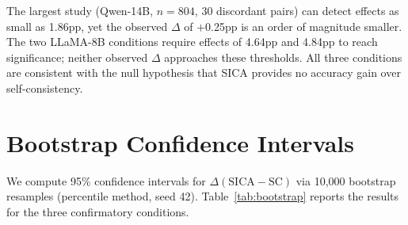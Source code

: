 \begin{table}[h]
\centering
\small
{}
\caption{Power analysis for confirmatory conditions ($n \geq 200$). MDE = minimum detectable effect at 80\% power. All observed effects fall below their respective MDEs, and observed power remains below 21\% in every case.}
\label{tab:power}
\end{table}

The largest study (Qwen-14B, $n{=}804$, 30 discordant pairs) can detect effects as small as 1.86pp, yet the observed $\Delta$ of $+$0.25pp is an order of magnitude smaller. The two LLaMA-8B conditions require effects of 4.64pp and 4.84pp to reach significance; neither observed $\Delta$ approaches these thresholds. All three conditions are consistent with the null hypothesis that SICA provides no accuracy gain over self-consistency.


\section{Bootstrap Confidence Intervals}
\label{app:bootstrap}

We compute 95\% confidence intervals for $\Delta(\text{SICA} - \text{SC})$ via 10{,}000 bootstrap resamples (percentile method, seed 42). Table~\ref{tab:bootstrap} reports the results for the three confirmatory conditions.

\begin{table}[h]
\centering
\small
{}
\caption{Bootstrap 95\% confidence intervals for $\Delta(\text{SICA} - \text{SC})$ in percentage points. All intervals include zero, consistent with no reliable accuracy difference.}
\label{tab:bootstrap}
\end{table}


